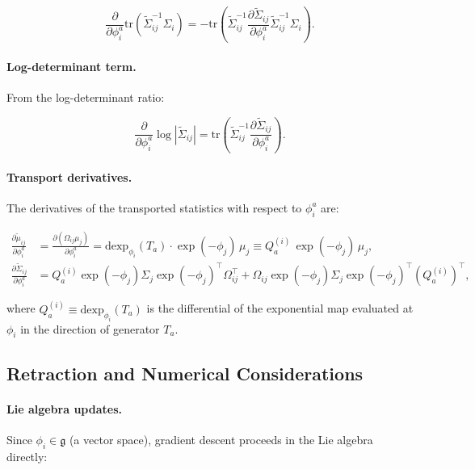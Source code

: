 \documentclass[twoside,11pt]{article}
\begin{document}
\begin{equation}
\frac{\partial}{\partial \phi_i^a}\mathrm{tr}(\tilde{\Sigma}_{ij}^{-1}\Sigma_i)
= -\mathrm{tr}\!\left(\tilde{\Sigma}_{ij}^{-1} \frac{\partial \tilde{\Sigma}_{ij}}{\partial \phi_i^a} \tilde{\Sigma}_{ij}^{-1} \Sigma_i\right).
\label{eq:trace_term_phi}
\end{equation}

\paragraph{Log-determinant term.} From the log-determinant ratio:

\begin{equation}
\frac{\partial}{\partial \phi_i^a}\log|\tilde{\Sigma}_{ij}|
= \mathrm{tr}\!\left(\tilde{\Sigma}_{ij}^{-1} \frac{\partial \tilde{\Sigma}_{ij}}{\partial \phi_i^a}\right).
\label{eq:logdet_term_phi}
\end{equation}

\paragraph{Transport derivatives.} The derivatives of the transported statistics with respect to $\phi_i^a$ are:

\begin{align}
\frac{\partial \tilde{\mu}_{ij}}{\partial \phi_i^a} &= \frac{\partial (\Omega_{ij}\mu_j)}{\partial \phi_i^a}
= \mathrm{dexp}_{\phi_i}(T_a) \cdot \exp(-\phi_j) \, \mu_j
\equiv Q_a^{(i)} \, \exp(-\phi_j) \, \mu_j, \label{eq:dtilde_mu} \\
\frac{\partial \tilde{\Sigma}_{ij}}{\partial \phi_i^a} &=
Q_a^{(i)} \exp(-\phi_j) \Sigma_j \exp(-\phi_j)^\top \Omega_{ij}^\top
+ \Omega_{ij} \exp(-\phi_j) \Sigma_j \exp(-\phi_j)^\top (Q_a^{(i)})^\top, \label{eq:dtilde_Sigma}
\end{align}

where $Q_a^{(i)} \equiv \mathrm{dexp}_{\phi_i}(T_a)$ is the differential of the exponential map evaluated at $\phi_i$ in the direction of generator $T_a$.

\subsection{Retraction and Numerical Considerations}

\paragraph{Lie algebra updates.} Since $\phi_i \in \mathfrak{g}$ (a vector space), gradient descent proceeds in the Lie algebra directly:
\end{document}
